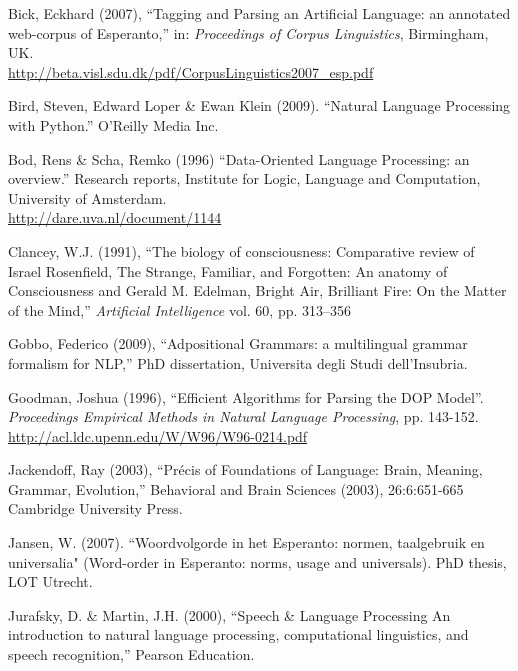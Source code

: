 \documentclass[10pt,a4paper]{article}
\begin{document}
\renewcommand*\descriptionlabel[1]{\hspace\labelsep\normalfont#1}

\begin{description*}
\item[Bick,] Eckhard (2007), ``Tagging and Parsing an Artificial Language: an
annotated web-corpus of Esperanto,'' in: {\em Proceedings of Corpus
Linguistics}, Birmingham, UK. \\
\url{http://beta.visl.sdu.dk/pdf/CorpusLinguistics2007_esp.pdf}

\item[Bird,] Steven, Edward Loper \& Ewan Klein (2009).
    ``Natural Language Processing with Python.''  O'Reilly Media Inc.

\item[Bod,] Rens \& Scha, Remko (1996) ``Data-Oriented Language Processing: an
overview.'' Research reports, Institute for Logic, Language and Computation,
University of Amsterdam. \\
\url{http://dare.uva.nl/document/1144}

\item[Clancey,] W.J. (1991), ``The biology of consciousness: Comparative review
of Israel Rosenfield, The Strange, Familiar, and Forgotten: An anatomy of
Consciousness and Gerald M. Edelman, Bright Air, Brilliant Fire: On the Matter
of the Mind,'' {\em Artificial Intelligence} vol. 60, pp. 313--356

\item[Gobbo,] Federico (2009), ``Adpositional Grammars: a multilingual grammar
formalism for NLP,'' PhD dissertation, Universita degli Studi dell'Insubria.

\item[Goodman,] Joshua (1996), ``Efficient Algorithms for Parsing the DOP
Model''. {\em Proceedings Empirical Methods in Natural Language Processing},
pp. 143-152. \\ \url{http://acl.ldc.upenn.edu/W/W96/W96-0214.pdf}

\item[Jackendoff,] Ray (2003), ``Précis of Foundations of Language: Brain, Meaning,
Grammar, Evolution,'' Behavioral and Brain Sciences (2003), 26:6:651-665
Cambridge University Press.

\item[Jansen,] W. (2007). ``Woordvolgorde in het Esperanto: normen, taalgebruik en
universalia" (Word-order in Esperanto: norms, usage and universals). PhD
thesis, LOT Utrecht.

\item[Jurafsky,] D. \& Martin, J.H. (2000), ``Speech \& Language Processing An
introduction to natural language processing, computational linguistics, and
speech recognition,'' Pearson Education.


\end{description*}
\end{document}
